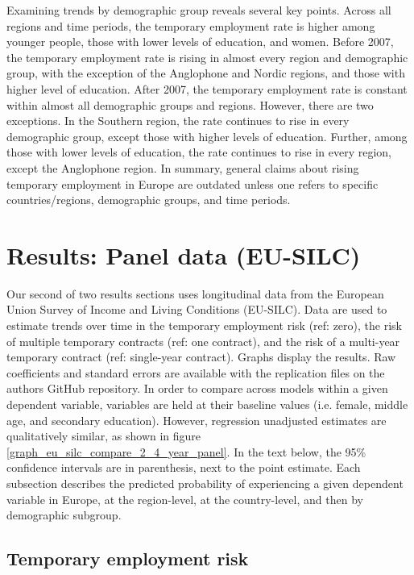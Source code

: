 \documentclass[12pt]{article}
\begin{document}
Examining trends by demographic group reveals several key points.  Across all regions and time periods, the temporary employment rate is higher among younger people, those with lower levels of education, and women.  Before 2007, the temporary employment rate is rising in almost every region and demographic group, with the exception of the Anglophone and Nordic regions, and those with higher level of education.  After 2007, the temporary employment rate is constant within almost all demographic groups and regions.  However, there are two exceptions.  In the Southern region, the rate continues to rise in every demographic group, except those with higher levels of education.  Further, among those with lower levels of education, the rate continues to rise in every region, except the Anglophone region.  In summary, general claims about rising temporary employment in Europe are outdated unless one refers to specific countries/regions, demographic groups, and time periods.  

\section{Results: Panel data (EU-SILC)}

Our second of two results sections uses longitudinal data from the European Union Survey of Income and Living Conditions (EU-SILC).  Data are used to estimate trends over time in the temporary employment risk (ref: zero), the risk of multiple temporary contracts (ref: one contract), and the risk of a multi-year temporary contract (ref: single-year contract).  Graphs display the results.  Raw coefficients and standard errors are available with the replication files on the authors GitHub repository.  In order to compare across models within a given dependent variable, variables are held at their baseline values (i.e. female, middle age, and secondary education).  However, regression unadjusted estimates are qualitatively similar, as shown in figure \ref{graph_eu_silc_compare_2_4_year_panel}.  In the text below, the 95\% confidence intervals are in parenthesis, next to the point estimate.  Each subsection describes the predicted probability of experiencing a given dependent variable in Europe, at the region-level, at the country-level, and then by demographic subgroup.  

\subsection{Temporary employment risk}
\end{document}
